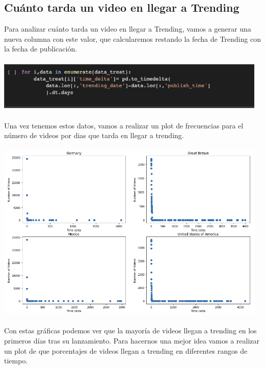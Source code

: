 \documentclass[a4paper,12pt]{article}
\begin{document}
\subsection{Cu\'anto tarda un video en llegar a Trending}
Para analizar cu\'anto tarda un video en llegar a Trending, vamos a generar una nueva columna con este valor, que calcularemos restando la fecha de Trending con la fecha de publicaci\'on.
\\
\\
\includegraphics[width=13cm]{time_delta_gen.png}
\\
\\
Una vez tenemos estos datos, vamos a realizar un plot de frecuencias para el n\'umero de videos por dias que tarda en llegar a trending.
\\
\\ 
\includegraphics[width=13cm]{plot_freq_times.png}
\\
\\
Con estas gr\'aficas podemos ver que la mayor\'ia de videos llegan a trending en los primeros d\'ias tras su lanzamiento. Para hacernos una mejor idea vamos a realizar un plot de que porcentajes de videos llegan a trending en diferentes rangos de tiempo.
\\
\\ 
\end{document}

